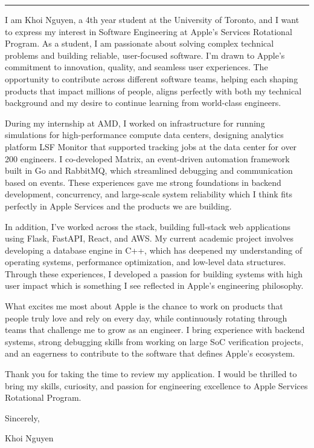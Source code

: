 \documentclass[
	12pt, %
]{resume} %
\begin{document}
    \medskip
    \hrule %
    \medskip  

I am Khoi Nguyen, a 4th year student at the University of Toronto, and I want to express my interest in Software Engineering at Apple's Services Rotational Program. As a student, I am passionate about solving complex technical problems and building reliable, user-focused software. I'm drawn to Apple's commitment to innovation, quality, and seamless user experiences. The opportunity to contribute across different software teams, helping each shaping products that impact millions of people, aligns perfectly with both my technical background and my desire to continue learning from world-class engineers.

During my internship at AMD, I worked on infrastructure for running simulations for high-performance compute data centers, designing analytics platform LSF Monitor that supported tracking jobs at the data center for over 200 engineers. I co-developed Matrix, an event-driven automation framework built in Go and RabbitMQ, which streamlined debugging and communication based on events. These experiences gave me strong foundations in backend development, concurrency, and large-scale system reliability which I think fits perfectly in Apple Services and the products we are building.

In addition, I've worked across the stack, building full-stack web applications using Flask, FastAPI, React, and AWS. My current academic project involves developing a database engine in C++, which has deepened my understanding of operating systems, performance optimization, and low-level data structures. Through these experiences, I developed a passion for building systems with high user impact which is something I see reflected in Apple's engineering philosophy.

What excites me most about Apple is the chance to work on products that people truly love and rely on every day, while continuously rotating through teams that challenge me to grow as an engineer. I bring experience with backend systems, strong debugging skills from working on large SoC verification projects, and an eagerness to contribute to the software that defines Apple's ecosystem.

Thank you for taking the time to review my application. I would be thrilled to bring my skills, curiosity, and passion for engineering excellence to Apple Services Rotational Program.

Sincerely,

Khoi Nguyen
\end{document}
